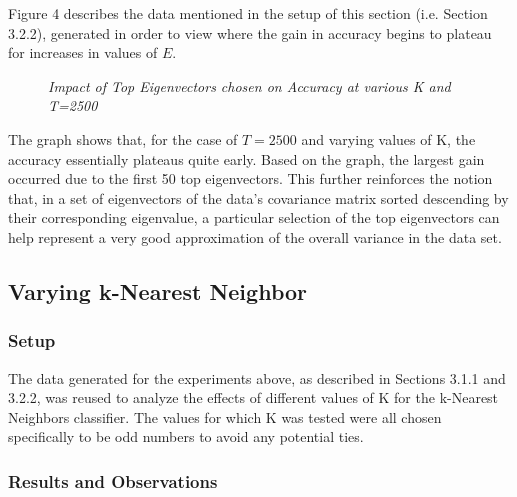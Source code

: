 \documentclass{article} %
\begin{document}
Figure 4 describes the data mentioned in the setup of this section (i.e. Section 3.2.2), generated in order to view where the gain in accuracy begins to plateau for increases in values of \(E\).

\begin{figure}[h]%
	\centering
    	\hfill%
    \caption{\textit{Impact of Top Eigenvectors chosen on Accuracy at various K and T=2500}}
    \label{fig:default}
\end{figure}

The graph shows that, for the case of \(T=2500\) and varying values of K, the accuracy essentially plateaus quite early. Based on the graph, the largest gain occurred due to the first 50 top eigenvectors. This further reinforces the notion that, in a set of eigenvectors of the data's covariance matrix sorted descending by their corresponding eigenvalue, a particular selection of the top eigenvectors can help represent a very good approximation of the overall variance in the data set.

\subsection{Varying k-Nearest Neighbor}

\subsubsection{Setup}

The data generated for the experiments above, as described in Sections 3.1.1 and 3.2.2, was reused to analyze the effects of different values of K for the k-Nearest Neighbors classifier. The values for which K was tested were all chosen specifically to be odd numbers to avoid any potential ties.

\subsubsection{Results and Observations}
\end{document}
